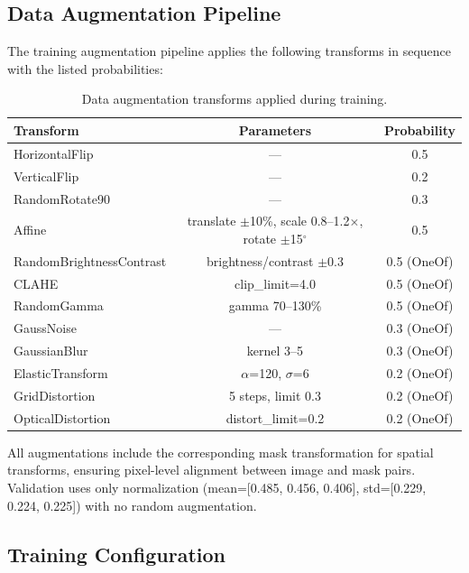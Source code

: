 \documentclass[12pt,a4paper]{article}
\begin{document}
\subsection{Data Augmentation Pipeline}

The training augmentation pipeline applies the following transforms in sequence with the listed probabilities:

\begin{table}[H]
\centering
\caption{Data augmentation transforms applied during training.}
\label{tab:augmentation}
\begin{tabular}{@{}lcc@{}}
\toprule
\textbf{Transform} & \textbf{Parameters} & \textbf{Probability} \\
\midrule
HorizontalFlip & --- & 0.5 \\
VerticalFlip & --- & 0.2 \\
RandomRotate90 & --- & 0.3 \\
Affine & translate $\pm$10\%, scale 0.8--1.2$\times$, rotate $\pm$15$^\circ$ & 0.5 \\
RandomBrightnessContrast & brightness/contrast $\pm$0.3 & 0.5 (OneOf) \\
CLAHE & clip\_limit=4.0 & 0.5 (OneOf) \\
RandomGamma & gamma 70--130\% & 0.5 (OneOf) \\
GaussNoise & --- & 0.3 (OneOf) \\
GaussianBlur & kernel 3--5 & 0.3 (OneOf) \\
ElasticTransform & $\alpha$=120, $\sigma$=6 & 0.2 (OneOf) \\
GridDistortion & 5 steps, limit 0.3 & 0.2 (OneOf) \\
OpticalDistortion & distort\_limit=0.2 & 0.2 (OneOf) \\
\bottomrule
\end{tabular}
\end{table}

All augmentations include the corresponding mask transformation for spatial transforms, ensuring pixel-level alignment between image and mask pairs. Validation uses only normalization (mean=[0.485, 0.456, 0.406], std=[0.229, 0.224, 0.225]) with no random augmentation.

\subsection{Training Configuration}
\end{document}
